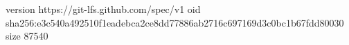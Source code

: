 version https://git-lfs.github.com/spec/v1
oid sha256:e3c540a492510f1eadebca2ce8dd77886ab2716c697169d3c0bc1b67fdd80030
size 87540
